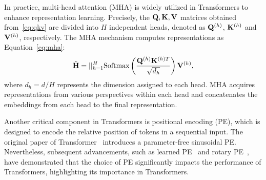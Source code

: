 In practice, multi-head attention (MHA) is widely utilized in Transformers to enhance representation learning. 
Precisely, the $\mathbf{Q}, \mathbf{K}, \mathbf{V}$ matrices obtained from~\cref{eq:qkv} are divided into $H$ independent heads, denoted as $\mathbf{Q}^{(h)}$, $\mathbf{K}^{(h)}$ and $\mathbf{V}^{(h)}$, respectively. 
The MHA mechanism computes representations as Equation~\eqref{eq:mha}:
\begin{align}
    \label{eq:mha}
    \Tilde{\mathbf{H}} = ||_{h=1}^{H} \text{Softmax}\left(\frac{\mathbf{Q}^{(h)}\mathbf{K}^{(h)T}}{\sqrt{d_h}}\right)\mathbf{V}^{(h)},
\end{align}
where $d_h = d/H$ represents the dimension assigned to each head.
MHA acquires representations from various perspectives within each head and concatenates the embeddings from each head to the final representation.

Another critical component in Transformers is positional encoding (PE), which is designed to encode the relative position of tokens in a sequential input. 
The original paper of Transformer~\cite{vaswani2017attention} introduces a parameter-free sinusoidal PE. Nevertheless, subsequent advancements, such as learned PE~\cite{gehring2017convolutional} and rotary PE~\cite{su2024roformer}, have demonstrated that the choice of PE significantly impacts the performance of Transformers, highlighting its importance in Transformers.


